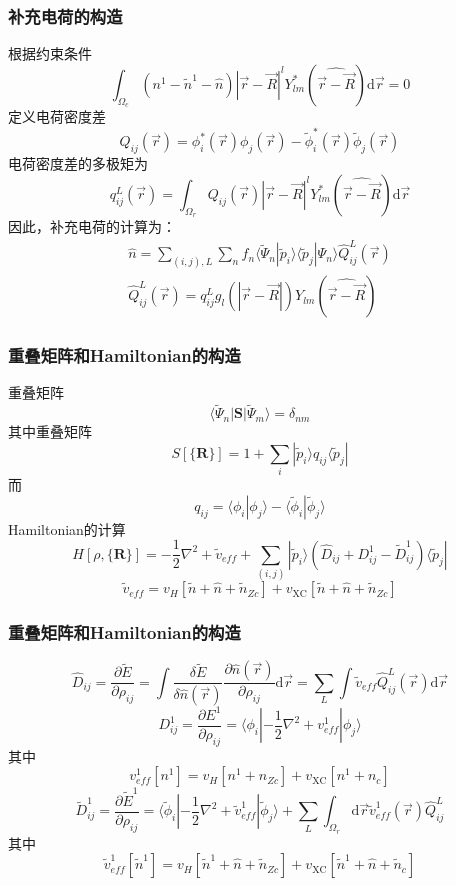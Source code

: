 \documentclass[cjk,slidestop,compress,mathserif,blue]{beamer}
\begin{document}
\frame
{
	\frametitle{补充电荷的构造}
	根据约束条件
	\begin{displaymath}
		\int_{\Omega_c}(n^1-\tilde n^1-\hat n)|\vec r-\vec R|^lY_{lm}^{\ast}(\widehat{\vec r-\vec R})\mathrm{d}\vec r=0
	\end{displaymath}
	定义电荷密度差
	\begin{displaymath}
		Q_{ij}(\vec r)=\phi_i^{\ast}(\vec r)\phi_j(\vec r)-\tilde\phi_i^{\ast}(\vec r)\tilde\phi_j(\vec r)
	\end{displaymath}
	电荷密度差的多极矩为
	\begin{displaymath}
		q_{ij}^L(\vec r)=\int_{\Omega_r}Q_{ij}(\vec r)|\vec r-\vec R|^lY_{lm}^{\ast}(\widehat{\vec r-\vec R})\mathrm{d}\vec r
	\end{displaymath}
	因此，补充电荷的计算为：
	\begin{displaymath}
		\begin{aligned}
			\hat n=\sum_{(i,j),L}\sum_n f_n\langle\tilde\Psi_n|\tilde p_i\rangle\langle\tilde p_j|\Psi_n\rangle\hat Q_{ij}^L(\vec r)\\
			\hat Q_{ij}^L(\vec r)=q_{ij}^Lg_l(|\vec r-\vec R|)Y_{lm}(\widehat{\vec r-\vec R})
		\end{aligned}
	\end{displaymath}
}

\frame
{
	\frametitle{重叠矩阵和Hamiltonian的构造}
重叠矩阵
	\begin{displaymath}
		\langle\tilde\Psi_n|\mathbf{S}|\tilde\Psi_m\rangle=\delta_{nm}
	\end{displaymath}
	其中重叠矩阵$$S[\{\mathbf{R}\}]=1+\sum_i|\tilde p_i\rangle q_{ij}\langle\tilde p_j|$$
	而$$q_{ij}=\langle\phi_i|\phi_j\rangle-\langle\tilde\phi_i|\tilde\phi_j\rangle$$
	\textrm{Hamiltonian}的计算
	\begin{displaymath}
		H[\rho,\{\mathbf{R}\}]=-\dfrac12\nabla^2+\tilde v_{eff}+\sum_{(i,j)}|\tilde p_i\rangle(\hat D_{ij}+D_{ij}^1-\tilde D_{ij}^1)\langle\tilde p_j|	
	\end{displaymath}
	$$\tilde v_{eff}=v_H[\tilde n+\hat n+\tilde n_{Zc}]+v_{\mathrm{XC}}[\tilde n+\hat n+\tilde n_{Zc}]$$
}

\frame
{
	\frametitle{重叠矩阵和Hamiltonian的构造}
	$$\hat D_{ij}=\dfrac{\partial\tilde E}{\partial\rho_{ij}}=\int\dfrac{\delta\tilde E}{\delta\hat n(\vec  r)}\dfrac{\partial\hat n(\vec r)}{\partial\rho_{ij}}\mathrm{d}\vec r=\sum_{L}\int\tilde v_{eff}\hat Q_{ij}^L(\vec r)\mathrm{d}\vec r$$
	$$D_{ij}^1=\dfrac{\partial E^1}{\partial\rho_{ij}}=\langle\phi_i|-\dfrac12\nabla^2+v_{eff}^1|\phi_j\rangle$$
	其中$$v_{eff}^1[n^1]=v_H[n^1+n_{Zc}]+v_{\mathrm{XC}}[n^1+n_c]$$
	$$\tilde D_{ij}^1=\dfrac{\partial\tilde E^1}{\partial\rho_{ij}}=\langle\tilde\phi_i|-\dfrac12\nabla^2+\tilde v_{eff}^1|\tilde\phi_j\rangle+\sum_L\int_{\Omega_r}\mathrm{d}\vec r\tilde v_{eff}^1(\vec r)\hat Q_{ij}^L$$
	其中$$\tilde v_{eff}^1[\tilde n^1]=v_H[\tilde n^1+\hat n+\tilde n_{Zc}]+v_{\mathrm{XC}}[\tilde n^1+\hat n+\tilde n_c]$$
}
\end{document}
